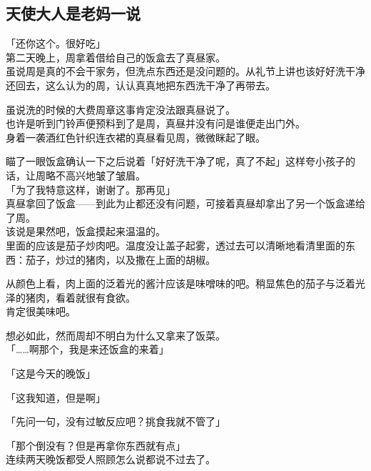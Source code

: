 \subsection{天使大人是老妈一说}

「还你这个。很好吃」\\

第二天晚上，周拿着借给自己的饭盒去了真昼家。\\

虽说周是真的不会干家务，但洗点东西还是没问题的。从礼节上讲也该好好洗干净还回去，这么认为的周，认认真真地把东西洗干净了再带去。

虽说洗的时候的大费周章这事肯定没法跟真昼说了。\\

也许是听到门铃声便预料到了是周，真昼并没有问是谁便走出门外。\\

身着一袭酒红色针织连衣裙的真昼看见周，微微眯起了眼。

瞄了一眼饭盒确认一下之后说着「好好洗干净了呢，真了不起」这样夸小孩子的话，让周略不高兴地皱了皱眉。\\

「为了我特意这样，谢谢了。那再见」\\

真昼拿回了饭盒——到此为止都还没有问题，可接着真昼却拿出了另一个饭盒递给了周。\\

该说是果然吧，饭盒摸起来温温的。\\

里面的应该是茄子炒肉吧。温度没让盖子起雾，透过去可以清晰地看清里面的东西：茄子，炒过的猪肉，以及撒在上面的胡椒。

从颜色上看，肉上面的泛着光的酱汁应该是味噌味的吧。稍显焦色的茄子与泛着光泽的猪肉，看着就很有食欲。\\

肯定很美味吧。

想必如此，然而周却不明白为什么又拿来了饭菜。\\

「……啊那个，我是来还饭盒的来着」

「这是今天的晚饭」

「这我知道，但是啊」

「先问一句，没有过敏反应吧？挑食我就不管了」

「那个倒没有？但是再拿你东西就有点」\\

连续两天晚饭都受人照顾怎么说都说不过去了。\\

